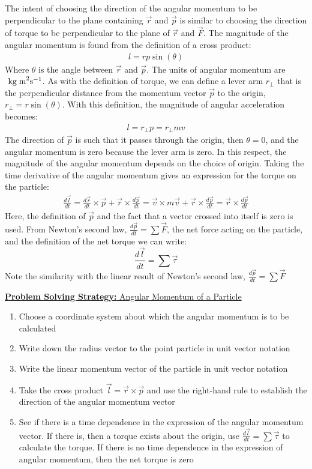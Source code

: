 \documentclass[a4paper]{article}
\let\bf\textbf
\newcommand\der[2]{\frac{d #1}{d #2}}
\newcommand\kgmms{\text{ kg\;m}^2\text{s}^{-1}}
\begin{document}
The intent of choosing the direction of the angular momentum to be perpendicular to the plane containing $\vec{r}$ and $\vec{p}$ is similar to choosing the direction of torque to be perpendicular to the plane of $\vec{r}$ and $\vec{F}$. The magnitude of the angular momentum is found from the definition of a cross product:
\begin{align*}
    l = rp\sin(\theta)
\end{align*}
Where $\theta$ is the angle between $\vec{r}$ and $\vec{p}$. The units of angular momentum are $\kgmms$. As with the definition of torque, we can define a lever arm $r_{\perp}$ that is the perpendicular distance from the momentum vector $\vec{p}$ to the origin, $r_{\perp} = r\sin(\theta)$. With this definition, the magnitude of angular acceleration becomes:
\begin{align*}
    l = r_{\perp}p = r_{\perp}mv
\end{align*}
The direction of $\vec{p}$ is such that it passes through the origin, then $\theta = 0$, and the angular momentum is zero because the lever arm is zero. In this respect, the magnitude of the angular momentum depends on the choice of origin. Taking the time derivative of the angular momentum gives an expression for the torque on the particle:
\begin{align*}
    \der{\vec{l}}{t} = \der{\vec{r}}{t} \times \vec{p} + \vec{r} \times \der{\vec{p}}{t} = \vec{v} \times m\vec{v} + \vec{r} \times \der{\vec{p}}{t} = \vec{r} \times \der{\vec{p}}{t}
\end{align*}
Here, the definition of $\vec{p}$ and the fact that a vector crossed into itself is zero is used. From Newton's second law, $\der{\vec{p}}{t} = \sum\vec{F}$, the net force acting on the particle, and the definition of the net torque we can write:
\begin{equation}
    \der{\vec{l}}{t} = \sum \vec{\tau}
\end{equation}
Note the similarity with the linear result of Newton's second law, $\der{\vec{p}}{t} = \sum\vec{F}$
\begin{shaded}
    \underline{\bf{Problem Solving Strategy:} Angular Momentum of a Particle}
    \begin{enumerate}
        \item Choose a coordinate system about which the angular momentum is to be calculated
        \item Write down the radius vector to the point particle in unit vector notation
        \item Write the linear momentum vector of the particle in unit vector notation
        \item Take the cross product $\vec{l} = \vec{r} \times \vec{p}$ and use the right-hand rule to establish the direction of the angular momentum vector
        \item See if there is a time dependence in the expression of the angular momentum vector. If there is, then a torque exists about the origin, use $\der{\vec{l}}{t} = \sum\vec{\tau}$ to calculate the torque. If there is no time dependence in the expression of angular momentum, then the net torque is zero
    \end{enumerate}
\end{shaded}
\end{document}
